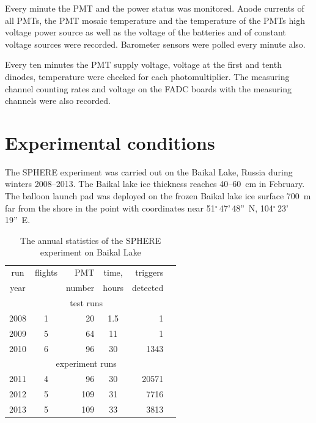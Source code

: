 \documentclass[final,5p,times,twocolumn]{elsarticle}
\begin{document}
Every minute the PMT and the power status was monitored. Anode currents of all PMTs, the PMT mosaic temperature and the temperature of the PMTs high voltage power source as well as the voltage of the batteries and of constant voltage sources were recorded. Barometer sensors were polled every minute also.

Every ten minutes the PMT supply voltage, voltage at the first and tenth dinodes, temperature were checked for each photomultiplier. The measuring channel counting rates and voltage on the FADC boards with the measuring channels were also recorded.



\section{Experimental conditions}
\label{sect:data}
 
The SPHERE experiment was carried out on the Baikal Lake, Russia during winters 2008--2013. The Baikal lake ice thickness reaches 40--60~cm in February. The balloon launch pad was deployed on the frozen Baikal lake ice surface 700~m far from the shore in the point with coordinates near 51$^\circ$\,47'\,48''~N, 104$^\circ$\,23'\,19''~E. 


\begin{table}[b]
\centering
\caption{The annual statistics of the SPHERE experiment on Baikal Lake}
\label{tab:statistics}
\vspace{1pc}
\begin{tabular}{|c||c|r|c|r|r|}
\hline
run  & flights & PMT    & time, & triggers \\ 
year &         & number & hours & detected \\ 
\hline \hline
\multicolumn{5}{|c|}{test runs} \\
\hline
2008 & 1 &  20 & 1.5 &    1 \\ 
2009 & 5 &  64 & 11 &     1 \\ 
2010 & 6 &  96 & 30 &  1343 \\
\hline
\multicolumn{5}{|c|}{experiment runs} \\
\hline
2011 & 4 &  96 & 30 & 20571 \\
2012 & 5 & 109 & 31 &  7716 \\
2013 & 5 & 109 & 33 &  3813 \\
\hline
\end{tabular}
\end{table}
\end{document}
